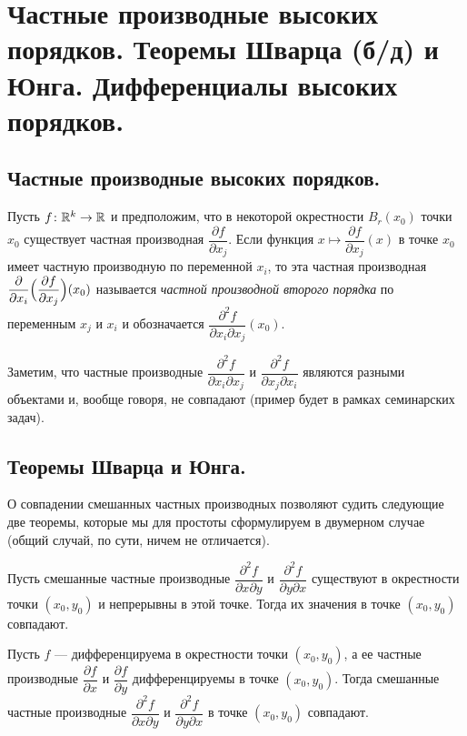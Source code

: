 \documentclass[a4paper]{article}
\theoremstyle{named}
\begin{document}
    \section{Частные производные высоких порядков. Теоремы Шварца (б/д) и Юнга. Дифференциалы высоких порядков.}

    \subsection{Частные производные высоких порядков.}

    \begin{definition*}
        Пусть $f\colon \mathbb{R}^k\to \mathbb{R}$ и предположим, что в некоторой окрестности $B_r(x_0)$ точки $x_0$ существует частная производная $\dfrac{\partial f}{\partial x_j}$. Если функция $x\mapsto \dfrac{\partial f}{\partial x_j}(x)$ в точке $x_0$ имеет частную производную по переменной $x_i$, то эта частная производная $\dfrac{\partial}{\partial x_i}\Bigl(\dfrac{\partial f}{\partial x_j}\Bigr) (x_0)$ называется {\it частной производной второго порядка} по переменным $x_j$ и $x_i$
        и обозначается $\dfrac{\partial^2 f}{\partial x_i\partial x_j}(x_0)$.
    \end{definition*}

    \begin{remark*}
        Заметим, что частные производные $\dfrac{\partial^2 f}{\partial x_i\partial x_j}$ и $\dfrac{\partial^2 f}{\partial x_j\partial x_i}$ являются разными объектами и, вообще говоря, не совпадают (пример будет в рамках семинарских задач).
    \end{remark*}

    \subsection{Теоремы Шварца и Юнга.}

    О совпадении смешанных частных производных позволяют судить следующие две теоремы, которые мы для простоты сформулируем в двумерном случае (общий случай, по сути, ничем не отличается).

    \begin{theorem}[Шварц]
        Пусть смешанные частные производные $\dfrac{\partial^2f}{\partial x\partial y}$ и $\dfrac{\partial^2f}{\partial y\partial x}$ существуют в окрестности точки $(x_0,y_0)$ и непрерывны в этой точке. Тогда их значения в точке $(x_0,y_0)$ совпадают.
    \end{theorem}

    \begin{theorem}[Юнг] Пусть $f$ --- дифференцируема в окрестности точки $(x_0,y_0)$,
    а ее частные производные $\dfrac{\partial f}{\partial x}$ и $\dfrac{\partial f}{\partial y}$
    дифференцируемы в точке $(x_0,y_0)$.
    Тогда смешанные частные производные $\dfrac{\partial^2f}{\partial x\partial y}$
    и $\dfrac{\partial^2f}{\partial y\partial x}$
    в точке $(x_0,y_0)$ совпадают.
    \end{theorem}
\end{document}
